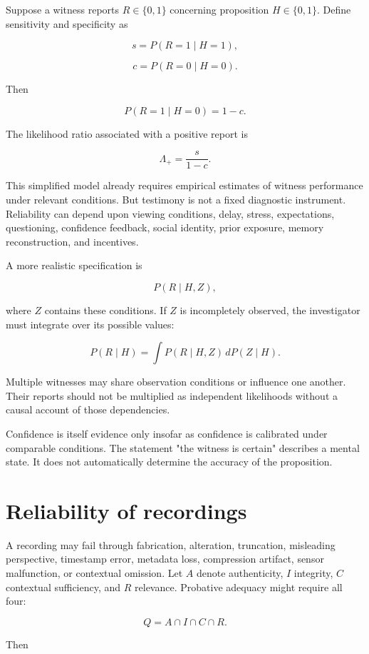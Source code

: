Suppose a witness reports \(R\in\{0,1\}\) concerning proposition \(H\in\{0,1\}\). Define sensitivity and specificity as

\[
s=P(R=1\mid H=1),
\]

\[
c=P(R=0\mid H=0).
\]

Then

\[
P(R=1\mid H=0)=1-c.
\]

The likelihood ratio associated with a positive report is

\[
\Lambda_+
=
\frac{s}{1-c}.
\]

This simplified model already requires empirical estimates of witness performance under relevant conditions. But testimony is not a fixed diagnostic instrument. Reliability can depend upon viewing conditions, delay, stress, expectations, questioning, confidence feedback, social identity, prior exposure, memory reconstruction, and incentives.

A more realistic specification is

\[
P(R\mid H,Z),
\]

where \(Z\) contains these conditions. If \(Z\) is incompletely observed, the investigator must integrate over its possible values:

\[
P(R\mid H)
=
\int P(R\mid H,Z)\,dP(Z\mid H).
\]

Multiple witnesses may share observation conditions or influence one another. Their reports should not be multiplied as independent likelihoods without a causal account of those dependencies.

Confidence is itself evidence only insofar as confidence is calibrated under comparable conditions. The statement "the witness is certain" describes a mental state. It does not automatically determine the accuracy of the proposition.

\section{Reliability of recordings}
\label{sec:a37}

A recording may fail through fabrication, alteration, truncation, misleading perspective, timestamp error, metadata loss, compression artifact, sensor malfunction, or contextual omission. Let \(A\) denote authenticity, \(I\) integrity, \(C\) contextual sufficiency, and \(R\) relevance. Probative adequacy might require all four:

\[
Q=A\cap I\cap C\cap R.
\]

Then

